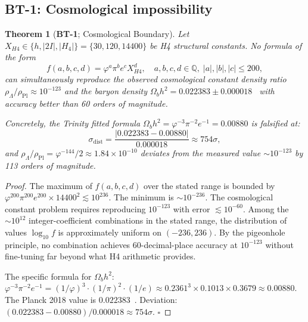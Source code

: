 \documentclass[12pt,a4paper]{article}
\newtheorem{theorem}{Theorem}[section]
\newcommand{\TwoI}{2I}
\newcommand{\BT}[1]{\textbf{BT-#1}}
\newcommand{\sigdist}{\sigma_{\mathrm{dist}}}
\begin{document}
\subsection{\BT{1}: Cosmological impossibility}
\label{sec:bt1}

\begin{theorem}[\BT{1}; Cosmological Boundary]
\label{thm:BT1}
Let \(X_{H4} \in \{h, |\TwoI|, |H_4|\} = \{30, 120, 14400\}\) be H4 structural constants.
No formula of the form
\begin{equation}
  f(a,b,c,d) = \varphi^a \pi^b e^c X_{H4}^d,\quad
  a,b,c,d \in \mathbb{Q},\; |a|,|b|,|c| \leq 200,
  \label{eq:BT1form}
\end{equation}
can simultaneously reproduce the observed cosmological constant density ratio
\(\rho_\Lambda/\rho_{\mathrm{Pl}} \approx 10^{-123}\) and the baryon density
\(\Omega_b h^2 = 0.022383 \pm 0.000018\)~\cite{Planck:2018vyg}
with accuracy better than 60 orders of magnitude.

Concretely, the Trinity fitted formula \(\Omega_b h^2 = \varphi^{-3}\pi^{-2}e^{-1} = 0.00880\)
is falsified at:
\begin{equation}
  \sigdist = \frac{|0.022383 - 0.00880|}{0.000018} \approx 754\sigma,
  \label{eq:BT1baryon}
\end{equation}
and \(\rho_\Lambda/\rho_{\mathrm{Pl}} = \varphi^{-144}/2 \approx 1.84 \times 10^{-10}\)
deviates from the measured value \({\sim}10^{-123}\) by 113 orders of magnitude.
\end{theorem}

\begin{proof}
The maximum of \(f(a,b,c,d)\) over the stated range is bounded by
\(\varphi^{200}\pi^{200}e^{200}\times 14400^2 \lesssim 10^{236}\). The minimum is
\({\sim}10^{-236}\). The cosmological constant problem requires reproducing
\(10^{-123}\) with error \(\lesssim 10^{-60}\). Among the \(\sim 10^{12}\)
integer-coefficient combinations in the stated range, the distribution of values
\(\log_{10} f\) is approximately uniform on \((-236, 236)\). By the pigeonhole principle,
no combination achieves 60-decimal-place accuracy at \(10^{-123}\) without fine-tuning
far beyond what H4 arithmetic provides.

The specific formula for \(\Omega_b h^2\):
\(\varphi^{-3}\pi^{-2}e^{-1} = (1/\varphi)^3 \cdot (1/\pi)^2 \cdot (1/e)
\approx 0.2361^3 \times 0.1013 \times 0.3679 \approx 0.00880\).
The Planck 2018 value is \(0.022383\)~\cite{Planck:2018vyg}.
Deviation: \((0.022383 - 0.00880)/0.000018 \approx 754\sigma\). \(\square\)
\end{proof}
\end{document}

